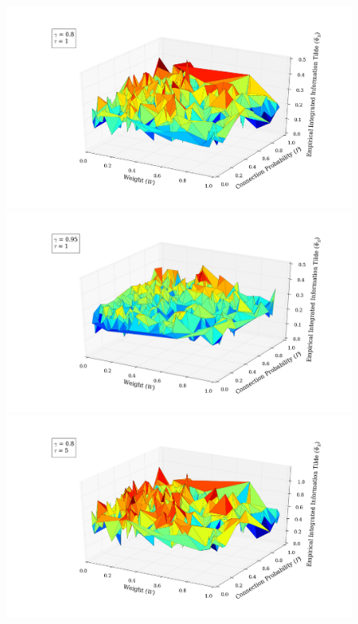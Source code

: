 \documentclass[a4paper,11pt]{article}
\begin{document}
\begin{figure}[H] 
	\begin{minipage}[b]{0.5\linewidth}
		\begin{center}
		\includegraphics[scale = 0.2]{figures/snn/p_w_phi_tilde_8_1}
		\end{center}
		\vspace{4ex}
	\end{minipage}
	\begin{minipage}[b]{0.5\linewidth}
		\begin{center}
		\includegraphics[scale = 0.2]{figures/snn/p_w_phi_tilde_95_1}
		\end{center}
		\vspace{4ex}
	\end{minipage}
	\begin{minipage}[b]{0.5\linewidth}
		\begin{center}
		\includegraphics[scale = 0.2]{figures/snn/p_w_phi_tilde_8_5}

\end{center}
\end{minipage}
\end{figure}
\end{document}
